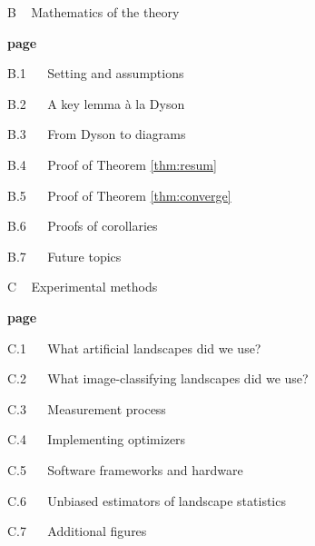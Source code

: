         {\bf
        \par\noindent B ~ Mathematics of the theory}                            \hfill {\bf page \pageref{appendix:math}}
        \par\indent     B.1 ~~ Setting and assumptions                          \hfill \pageref{appendix:assumptions}
        \par\indent     B.2 ~~ A key lemma \`a la Dyson                         \hfill \pageref{appendix:key-lemma}
        \par\indent     B.3 ~~ From Dyson to diagrams                           \hfill \pageref{appendix:toward-diagrams}
        \par\indent     B.4 ~~ Proof of Theorem \ref{thm:resum}                 \hfill \pageref{appendix:resum}
        \par\indent     B.5 ~~ Proof of Theorem \ref{thm:converge}              \hfill \pageref{appendix:converge}
        \par\indent     B.6 ~~ Proofs of corollaries                            \hfill \pageref{appendix:corollaries}
        \par\indent     B.7 ~~ Future topics                                    \hfill \pageref{appendix:future}
    
        {\bf
        \par\noindent C ~ Experimental methods}                                 \hfill {\bf page \pageref{appendix:experiments}}
        \par\indent     C.1 ~~ What artificial landscapes did we use?           \hfill \pageref{appendix:artificial}  
        \par\indent     C.2 ~~ What image-classifying landscapes did we use?    \hfill \pageref{appendix:natural}
        \par\indent     C.3 ~~ Measurement process                              \hfill \pageref{appendix:measure}
        \par\indent     C.4 ~~ Implementing optimizers                          \hfill \pageref{appendix:optimizers}
        \par\indent     C.5 ~~ Software frameworks and hardware                 \hfill \pageref{appendix:frameworks}
        \par\indent     C.6 ~~ Unbiased estimators of landscape statistics      \hfill \pageref{appendix:bessel}
        \par\indent     C.7 ~~ Additional figures                               \hfill \pageref{appendix:figures}

